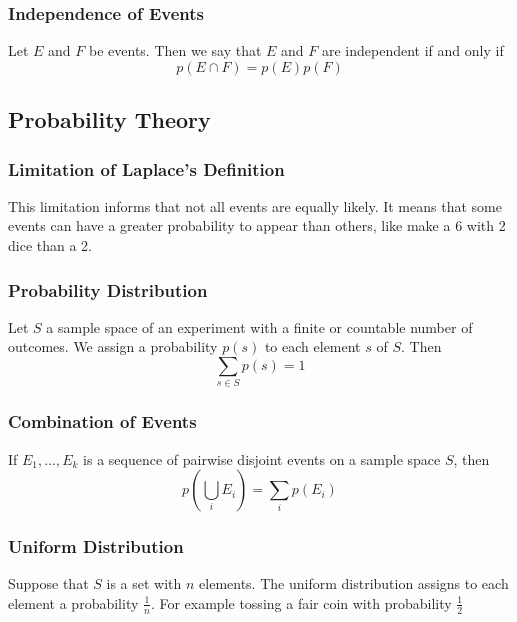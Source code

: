 \documentclass{article}
\begin{document}
\subsubsection{Independence of Events}
\begin{tcolorbox}[sharp corners, colback=green!30, colframe=green!80!blue, title=Independence of Events]
Let $ E $ and $ F $ be events. Then we say that $ E $ and $ F $ are independent if and only if
\begin{equation}
p(E \cap F) = p(E)p(F)
\end{equation}
\end{tcolorbox}

\subsection{Probability Theory}
\subsubsection{Limitation of Laplace's Definition} This limitation informs that not all events are equally likely. It means that some events can have a greater probability to appear than others, like make a 6 with 2 dice than a 2.

\subsubsection{Probability Distribution} Let $ S $ a sample space of an experiment with a finite or countable number of outcomes. We assign a probability $ p(s) $ to each element $ s $ of $ S $. Then
\begin{equation}
\sum_{s \in S}p(s) = 1
\end{equation}

\subsubsection{Combination of Events} If $ E_1,...,E_k $ is a sequence of pairwise disjoint events on a sample space $ S $, then
\begin{equation}
p(\bigcup\limits_{i}E_i) = \sum_{i}p(E_i)
\end{equation}

\subsubsection{Uniform Distribution} Suppose that $ S $ is a set with $ n $ elements. The uniform distribution assigns to each element a probability $ \frac{1}{n} $. For example tossing a fair coin with probability $ \frac{1}{2} $
\end{document}
